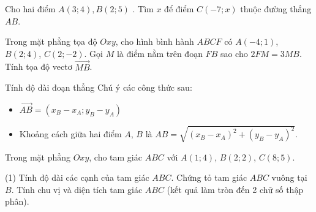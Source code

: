 \begin{vd}
	Cho hai điểm $A\left( 3;4 \right),B\left( 2;5 \right)$ . Tìm $x$ để điểm $C\left( -7;x \right)$ thuộc đường thẳng $AB$.
\end{vd}

\begin{vd}
	Trong mặt phẳng tọa độ $Oxy$, cho hình bình hành $ABCF$ có $A(-4;1)$, $B(2;4)$, $C(2;-2)$. Gọi $M$ là điểm nằm trên đoạn $FB$ sao cho $2FM=3MB$. Tính tọa độ vectơ $\vec{MB}$.
\end{vd}

\begin{dang}{Tính độ dài đoạn thẳng} 
	Chú ý các công thức sau:
	\begin{itemize}
		\item [$\bullet$] $\overrightarrow{AB}=\left( x_B-x_A;y_B-y_A\right)$ 
		\item [$\bullet$] Khoảng cách giữa hai điểm $A$, $B$ là $AB=\sqrt{\left( x_B-x_A\right)^2+\left(y_B-y_A\right)^2}$.
	\end{itemize}
\end{dang}

\begin{vd}
	Trong mặt phẳng $Oxy$, cho tam giác $ABC$ với $A(1;4)$, $B(2;2)$, $C(8;5)$.
	\begin{tasks}(1)
		\task Tính độ dài các cạnh của tam giác $ABC$. Chứng tỏ tam giác $ABC$ vuông tại $B$.
		\task Tính chu vị và diện tích tam giác $ABC$ (kết quả làm tròn đến 2 chữ số thập phân).
	\end{tasks}
\end{vd}

